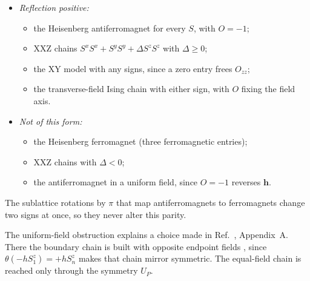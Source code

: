 \documentclass[aps,prl,reprint,amsmath,amssymb,nofootinbib,raggedbottom]{revtex4-2}
\begin{document}
\begin{itemize}
\item \emph{Reflection positive:}
 \begin{itemize}
 \item the Heisenberg antiferromagnet for every $S$, with $O=-1$;
 \item XXZ chains $S^xS^x+S^yS^y+\Delta S^zS^z$ with $\Delta\ge0$;
 \item the XY model with any signs, since a zero entry frees $O_{zz}$;
 \item the transverse-field Ising chain with either sign, with $O$ fixing
 the field axis.
 \end{itemize}
\item \emph{Not of this form:}
 \begin{itemize}
 \item the Heisenberg ferromagnet (three ferromagnetic entries);
 \item XXZ chains with $\Delta<0$;
 \item the antiferromagnet in a uniform field, since $O=-1$ reverses $\bm h$.
 \end{itemize}
\end{itemize}

The sublattice rotations by $\pi$ that map antiferromagnets to ferromagnets
change two signs at once, so they never alter this parity.

The uniform-field obstruction explains a choice made in Ref.~\cite{main},
Appendix~A. There the boundary chain is built with opposite endpoint fields
\fieldopp, since $\theta(-hS^z_1)=+hS^z_n$ makes that chain mirror
symmetric. The equal-field chain \fieldsame{} is reached only through the
symmetry $U_P$.
\end{document}
